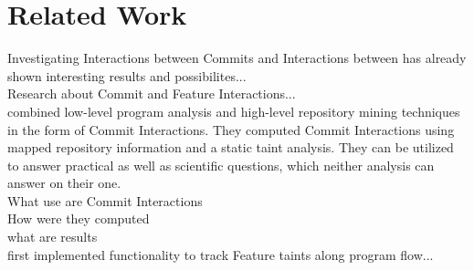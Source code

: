 \section*{Related Work}\label{ch:relatedwork}

Investigating Interactions between Commits and Interactions between has already shown interesting results and possibilites... \\
Research about Commit and Feature Interactions... \\

\citet{sattler2023seal} combined low-level program analysis and high-level repository mining techniques in the form of Commit Interactions.
They computed Commit Interactions using mapped repository information and a static taint analysis.
They can be utilized to answer practical as well as scientific questions, which neither analysis can answer on their one. \\

What use are Commit Interactions \\
How were they computed \\
what are results \\

\citet{lillack2014tracking} first implemented functionality to track Feature taints along program flow...
